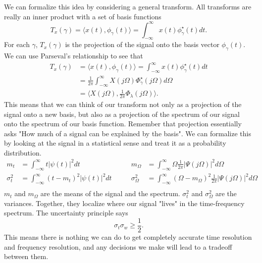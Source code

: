 We can formalize this idea by considering a general transform. All transforms are really an inner product with a set of basis functions
\[
  T_x(\gamma) = \langle x(t), \phi_\gamma(t) \rangle=\int_{-\infty}^{\infty}x(t)\phi_\gamma^\star(t)dt.
\]
For each $\gamma$, $T_x(\gamma)$ is the projection of the signal onto the basis vector $\phi_\gamma(t)$. 
We can use Parseval's relationship to see that
\begin{align*}
  T_x(\gamma) &= \langle x(t), \phi_\gamma(t) \rangle =\int_{-\infty}^{\infty}x(t)\phi_\gamma^\star(t)dt \\
  &= \frac{1}{2\pi}\int_{-\infty}^{\infty}X(j\Omega)\Phi_\gamma^\star(j\Omega)d\Omega \\
  &= \langle X(j\Omega), \frac{1}{2\pi}\Phi_\lambda(j\Omega)\rangle.
\end{align*}
This means that we can think of our transform not only as a projection of the signal onto a new basis, but also as a projection of the spectrum of our signal onto the spectrum of our basis function. 
Remember that projection essentially asks "How much of a signal can be explained by the basis".
We can formalize this by looking at the signal in a statistical sense and treat it as a probability distribution.
\begin{align*}
  m_t &= \int_{-\infty}^{\infty}t|\psi(t)|^2dt &\qquad m_\Omega &= \int_{-\infty}^{\infty}\Omega\frac{1}{2\pi}|\Psi(j\Omega)|^2d\Omega\\
  \sigma_t^2 &= \int_{-\infty}^{\infty}(t-m_t)^2|\psi(t)|^2dt &\qquad \sigma^2_\Omega &= \int_{-\infty}^{\infty}(\Omega-m_\Omega)^2\frac{1}{2\pi}|\Psi(j\Omega)|^2d\Omega\\
\end{align*}
$m_t$ and $m_\Omega$ are the means of the signal and the spectrum. $\sigma_t^2$ and $\sigma_\Omega^2$ are the variances. Together, they localize where our signal "lives" in the time-frequency spectrum.
The uncertainty principle says
\[
  \sigma_t\sigma_w \ge \frac{1}{2}.
\]
This means there is nothing we can do to get completely accurate time resolution and frequency resolution, and any decisions we make will
lead to a tradeoff between them.
